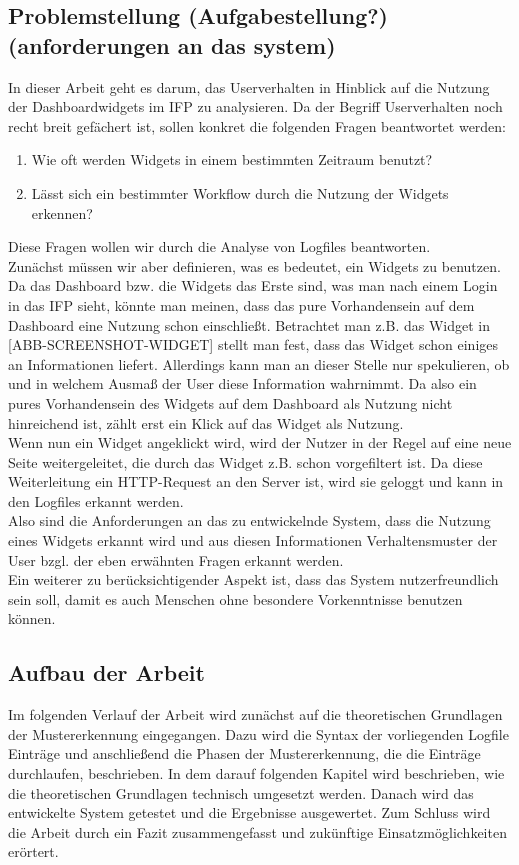 \subsection{Problemstellung (Aufgabestellung?) (anforderungen an das system)}
\label{sub:Problemstellung}
In dieser Arbeit geht es darum, das Userverhalten in Hinblick auf die Nutzung der Dash\-boardwidgets im IFP zu analysieren. Da der Begriff Userverhalten noch recht breit gefächert ist, sollen konkret die folgenden Fragen beantwortet werden:
\begin{enumerate}
	\item Wie oft werden Widgets in einem bestimmten Zeitraum benutzt? \label{intro:q1}\\
	\item Lässt sich ein bestimmter Workflow durch die Nutzung der Widgets erkennen?\\
\end{enumerate}
Diese Fragen wollen wir durch die Analyse von Logfiles beantworten.\\
Zunächst müssen wir aber definieren, was es bedeutet, ein Widgets zu benutzen. Da das Dashboard bzw. die Widgets das Erste sind, was man nach einem Login in das IFP sieht, könnte man meinen, dass das pure Vorhandensein auf dem Dashboard eine Nutzung schon einschließt. Betrachtet man z.B. das Widget in [ABB-SCREENSHOT-WIDGET] stellt man fest, dass das Widget schon einiges an Informationen liefert. Allerdings kann man an dieser Stelle nur spekulieren, ob und in welchem Ausmaß der User diese Information wahrnimmt. Da also ein pures Vorhandensein des Widgets auf dem Dashboard als Nutzung nicht hinreichend ist, zählt erst ein Klick auf das Widget als Nutzung.\\
Wenn nun ein Widget angeklickt wird, wird der Nutzer in der Regel auf eine neue Seite weitergeleitet, die durch das Widget z.B. schon vorgefiltert ist. Da diese Weiterleitung ein HTTP-Request an den Server ist, wird sie geloggt und kann in den Logfiles erkannt werden.\\
Also sind die Anforderungen an das zu entwickelnde System, dass die Nutzung eines Widgets erkannt wird und aus diesen Informationen Verhaltensmuster der User bzgl. der eben erwähnten Fragen erkannt werden.\\
Ein weiterer zu berücksichtigender Aspekt ist, dass das System nutzerfreundlich sein soll, damit es auch Menschen ohne besondere Vorkenntnisse benutzen können.

\subsection{Aufbau der Arbeit}
\label{sub:Aufbau der Arbeit}
Im folgenden Verlauf der Arbeit wird zunächst auf die theoretischen Grundlagen der Mustererkennung eingegangen. Dazu wird die Syntax der vorliegenden Logfile Einträge und anschließend die Phasen der Mustererkennung, die die Einträge durchlaufen, beschrieben. In dem darauf folgenden Kapitel wird beschrieben, wie die theoretischen Grundlagen technisch umgesetzt werden. Danach wird das entwickelte System getestet und die Ergebnisse ausgewertet. Zum Schluss wird die Arbeit durch ein Fazit zusammengefasst und zukünftige Einsatzmöglichkeiten erörtert.

